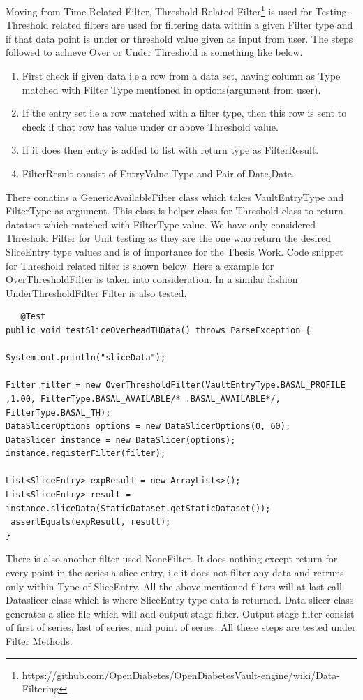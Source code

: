 \documentclass[article,type=msc,colorback,accentcolor=tud9c,twoside,11pt]{tudthesis}
\begin{document}
Moving from Time-Related Filter, Threshold-Related Filter\footnote{https://github.com/OpenDiabetes/OpenDiabetesVault-engine/wiki/Data-Filtering} is used for Testing. Threshold related filters are used for filtering data within a given Filter type and if that data point is under or threshold value given as input from user. The steps followed to achieve Over or Under Threshold is something like below.
\begin{enumerate}
	\item First check if given data i.e a row from a data set, having column as Type matched with Filter Type mentioned in options(argument from user).
	\item If the entry set i.e a row matched with a filter type, then this row is sent to check if that row has value under or above Threshold value.
	\item If it does then entry is added to list with return type as FilterResult.
	\item FilterResult consist of EntryValue Type and Pair of Date,Date.
\end{enumerate}
There conatins a GenericAvailableFilter class which takes VaultEntryType and FilterType as argument. This class is helper class for Threshold class to return datatset which  matched with FilterType value. We have only considered Threshold Filter for Unit testing as they are the one who return the desired SliceEntry type values and is of importance for the Thesis Work. Code snippet for Threshold related filter is shown below. Here a example for OverThresholdFilter is taken into consideration. In a similar fashion UnderThresholdFilter Filter is also tested.
\begin{lstlisting}
   @Test
public void testSliceOverheadTHData() throws ParseException {

System.out.println("sliceData");     

Filter filter = new OverThresholdFilter(VaultEntryType.BASAL_PROFILE ,1.00, FilterType.BASAL_AVAILABLE/* .BASAL_AVAILABLE*/, FilterType.BASAL_TH);
DataSlicerOptions options = new DataSlicerOptions(0, 60);
DataSlicer instance = new DataSlicer(options);
instance.registerFilter(filter);

List<SliceEntry> expResult = new ArrayList<>();
List<SliceEntry> result = instance.sliceData(StaticDataset.getStaticDataset());
 assertEquals(expResult, result);
}
\end{lstlisting}
There is also another filter used NoneFilter. It does nothing except return for every point in the series a slice entry, i.e it does not filter any data and retruns only within Type of SliceEntry. All the above mentioned filters will at last call Dataslicer class which is where SliceEntry type data is returned. Data slicer class generates a slice file  which will add output stage filter. Output stage filter consist of first of series, last of series, mid point of series. All these steps are tested under Filter Methods.
\cleardoublepage
\cleardoublepage


\end{document}
